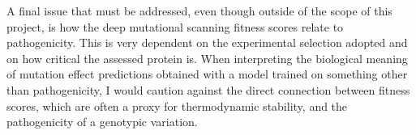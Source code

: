 A final issue that must be addressed, even though outside of the scope of this project, is how the deep mutational scanning fitness scores relate to pathogenicity.
This is very dependent on the experimental selection adopted and on how critical the assessed protein is.
When interpreting the biological meaning of mutation effect predictions obtained with a model trained on something other than pathogenicity, I would caution against the direct connection between fitness scores, which are often a proxy for thermodynamic stability, and the pathogenicity of a genotypic variation.
